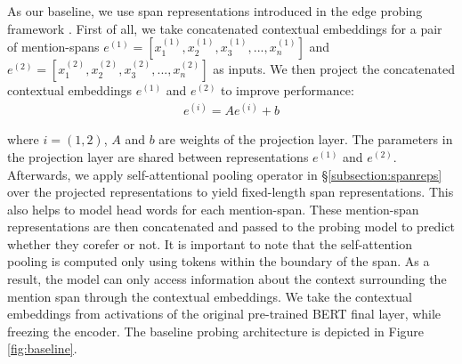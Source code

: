 \documentclass[11pt]{article}
\begin{document}



As our baseline, we use span representations introduced in the edge probing framework \parencite{tenney2019context}. First of all, we take concatenated contextual embeddings for a pair of mention-spans $e^{(1)} = [x_{1}^{(1)}, x_{2}^{(1)}, x_{3}^{(1)}, ..., x_{n}^{(1)}]$ and $e^{(2)} = [x_{1}^{(2)}, x_{2}^{(2)}, x_{3}^{(2)}, ..., x_{n}^{(2)}]$ as inputs. We then project the concatenated contextual embeddings $e^{(1)}$ and $e^{(2)}$ to improve performance:
\begin{align}
e^{(i)} = Ae^{(i)} + b
\end{align}

where $i = (1,2)$, $A$ and $b$ are weights of the projection layer. The parameters in the projection layer are shared between representations $e^{(1)}$ and $e^{(2)}$. Afterwards, we apply self-attentional pooling operator in \S \ref{subsection:spanreps} over the projected representations to yield fixed-length span representations. This also helps to model head words for each mention-span. These mention-span representations are then concatenated and passed to the probing model to predict whether they corefer or not. It is important to note that the self-attention pooling is computed only using tokens within the boundary of the span. As a result, the model can only access information about the context surrounding the mention span through the contextual embeddings. We take the contextual embeddings from activations of the original pre-trained BERT final layer, while freezing the encoder. The baseline probing architecture is depicted in Figure \ref{fig:baseline}. 
\end{document}
